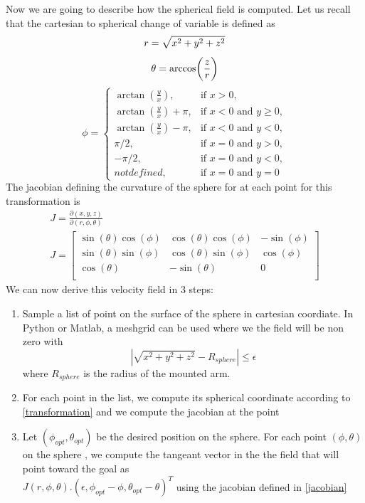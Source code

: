 Now we are going to describe how the spherical field is computed. 
Let us recall that the cartesian to spherical change of variable is defined as
\begin{equation} 
    r = \sqrt{x^2+y^2+z^2}\\ \nonumber 
\end{equation}
\begin{equation}
    \theta = \arccos(\frac{z}{r})\\\nonumber 
\end{equation}
\begin{equation}
    \label{transformation}
    \phi =
    \begin{cases}
        \arctan(\frac{y}{x}), & \text{if $x>0$},\\
        \arctan(\frac{y}{x}) + \pi, & \text{if $x<0$ and $y\geq 0$},\\
        \arctan(\frac{y}{x}) - \pi, & \text{if $x<0$ and $y<0$},\\
        \pi/2, & \text{if $x=0$ and $y>0$},\\
        -\pi/2, & \text{if $x=0$ and $y<0$},\\
        not defined , & \text{if $x=0$ and $y=0$}
    \end{cases}       
\end{equation}  
The jacobian defining the curvature of the sphere for at each point for this transformation is 
\begin{align}
    J = \frac{\partial{(x,y,z)}}{\partial{(r,\phi,\theta)}} \nonumber\\
    J = \begin{bmatrix}
        \sin(\theta)\cos(\phi) & \cos(\theta)\cos(\phi) & -\sin(\phi)\\
        \sin(\theta)\sin(\phi) & \cos(\theta)\sin(\phi) & \cos(\phi)\\
        \cos(\theta) & -\sin(\theta) & 0\\
        \end{bmatrix}
        \label{jacobian}
\end{align}
We can now derive this velocity field in 3 steps:
\begin{enumerate}
    \item Sample a list of point on the surface of the sphere in cartesian coordiate. In Python or Matlab, a meshgrid can be used where we the field will be non zero with \begin{equation} | \sqrt{x^2+y^2+z^2}-R_{sphere}|\leq\epsilon\nonumber \end{equation} where $R_{sphere}$ is the radius of the mounted arm.
    \item For each point in the list, we compute its spherical coordinate according to \ref{transformation} and we compute the jacobian at the point
    \item Let $(\phi_{opt}, \theta_{opt})$ be the desired position on the sphere. For each point $(\phi, \theta)$ on the sphere , we compute the tangeant vector in the the field that will point toward the goal as \\$J(r, \phi, \theta).(\epsilon, \phi_{opt}-\phi, \theta_{opt}-\theta)^T$ using the jacobian defined in \ref{jacobian} 

\end{enumerate}

